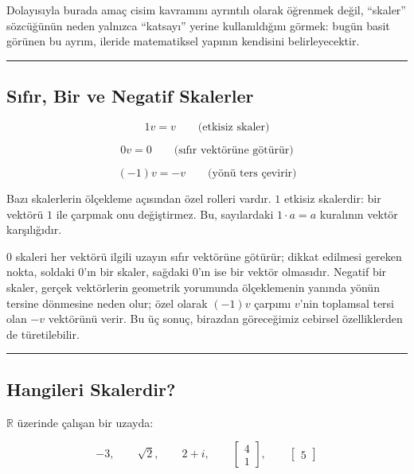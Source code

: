 \documentclass[
  a4paper,
  DIV=11,
  numbers=noendperiod]{scrartcl}
\begin{document}
Dolayısıyla burada amaç cisim kavramını ayrıntılı olarak öğrenmek değil,
``skaler'' sözcüğünün neden yalnızca ``katsayı'' yerine kullanıldığını
görmek: bugün basit görünen bu ayrım, ileride matematiksel yapının
kendisini belirleyecektir.

\begin{center}\rule{0.5\linewidth}{0.5pt}\end{center}

\subsection{Sıfır, Bir ve Negatif
Skalerler}\label{sux131fux131r-bir-ve-negatif-skalerler}

\[
1v=v
\qquad\text{(etkisiz skaler)}
\]

\[
0v=0
\qquad\text{(sıfır vektörüne götürür)}
\]

\[
(-1)v=-v
\qquad\text{(yönü ters çevirir)}
\]

Bazı skalerlerin ölçekleme açısından özel rolleri vardır. \(1\) etkisiz
skalerdir: bir vektörü \(1\) ile çarpmak onu değiştirmez. Bu,
sayılardaki \(1\cdot a=a\) kuralının vektör karşılığıdır.

\(0\) skaleri her vektörü ilgili uzayın sıfır vektörüne götürür; dikkat
edilmesi gereken nokta, soldaki \(0\)'ın bir skaler, sağdaki \(0\)'ın
ise bir vektör olmasıdır. Negatif bir skaler, gerçek vektörlerin
geometrik yorumunda ölçeklemenin yanında yönün tersine dönmesine neden
olur; özel olarak \((-1)v\) çarpımı \(v\)'nin toplamsal tersi olan
\(-v\) vektörünü verir. Bu üç sonuç, birazdan göreceğimiz cebirsel
özelliklerden de türetilebilir.

\begin{center}\rule{0.5\linewidth}{0.5pt}\end{center}

\subsection{Hangileri Skalerdir?}\label{hangileri-skalerdir}

\(\mathbb{R}\) üzerinde çalışan bir uzayda:

\[
-3,\qquad
\sqrt{2},\qquad
2+i,\qquad
\begin{bmatrix}4\\1\end{bmatrix},\qquad
\begin{bmatrix}5\end{bmatrix}
\]
\end{document}
